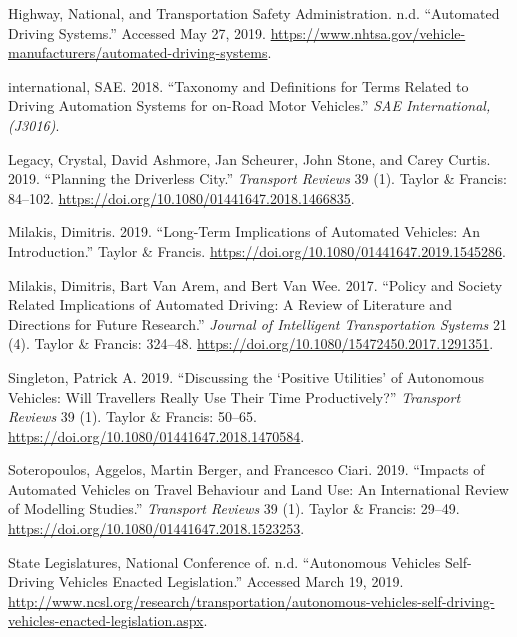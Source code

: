 \documentclass[12pt,]{article}
\begin{document}
\leavevmode\hypertarget{ref-NHTSA2019ADS}{}%
Highway, National, and Transportation Safety Administration. n.d.
``Automated Driving Systems.'' Accessed May 27, 2019.
\url{https://www.nhtsa.gov/vehicle-manufacturers/automated-driving-systems}.

\leavevmode\hypertarget{ref-sae2018taxonomy}{}%
international, SAE. 2018. ``Taxonomy and Definitions for Terms Related
to Driving Automation Systems for on-Road Motor Vehicles.'' \emph{SAE
International,(J3016)}.

\leavevmode\hypertarget{ref-legacy2019planning}{}%
Legacy, Crystal, David Ashmore, Jan Scheurer, John Stone, and Carey
Curtis. 2019. ``Planning the Driverless City.'' \emph{Transport Reviews}
39 (1). Taylor \& Francis: 84--102.
\url{https://doi.org/10.1080/01441647.2018.1466835}.

\leavevmode\hypertarget{ref-milakis2019long}{}%
Milakis, Dimitris. 2019. ``Long-Term Implications of Automated Vehicles:
An Introduction.'' Taylor \& Francis.
\url{https://doi.org/10.1080/01441647.2019.1545286}.

\leavevmode\hypertarget{ref-milakis2017policy}{}%
Milakis, Dimitris, Bart Van Arem, and Bert Van Wee. 2017. ``Policy and
Society Related Implications of Automated Driving: A Review of
Literature and Directions for Future Research.'' \emph{Journal of
Intelligent Transportation Systems} 21 (4). Taylor \& Francis: 324--48.
\url{https://doi.org/10.1080/15472450.2017.1291351}.

\leavevmode\hypertarget{ref-singleton2019discussing}{}%
Singleton, Patrick A. 2019. ``Discussing the `Positive Utilities' of
Autonomous Vehicles: Will Travellers Really Use Their Time
Productively?'' \emph{Transport Reviews} 39 (1). Taylor \& Francis:
50--65. \url{https://doi.org/10.1080/01441647.2018.1470584}.

\leavevmode\hypertarget{ref-soteropoulos2019impacts}{}%
Soteropoulos, Aggelos, Martin Berger, and Francesco Ciari. 2019.
``Impacts of Automated Vehicles on Travel Behaviour and Land Use: An
International Review of Modelling Studies.'' \emph{Transport Reviews} 39
(1). Taylor \& Francis: 29--49.
\url{https://doi.org/10.1080/01441647.2018.1523253}.

\leavevmode\hypertarget{ref-NCSL2019AV}{}%
State Legislatures, National Conference of. n.d. ``Autonomous Vehicles
\textbar{} Self-Driving Vehicles Enacted Legislation.'' Accessed March
19, 2019.
\url{http://www.ncsl.org/research/transportation/autonomous-vehicles-self-driving-vehicles-enacted-legislation.aspx}.
\end{document}
